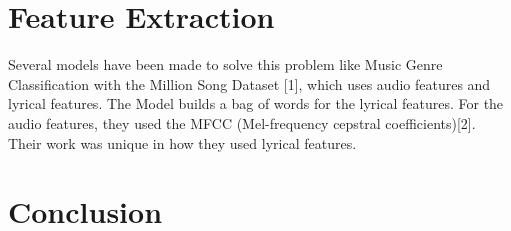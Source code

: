 \documentclass[conference]{IEEEtran}
\begin{document}
                            \section{Feature Extraction}
                            Several models have been made to solve this problem like Music Genre Classification with the Million Song Dataset [1], which uses audio features and lyrical features. The Model builds a bag of words for the lyrical features. For the audio features, they used the MFCC (Mel-frequency cepstral coefficients)[2]. Their work was unique in how they used lyrical features.


                            \section{Conclusion}
                            \blindtext






\end{document}
